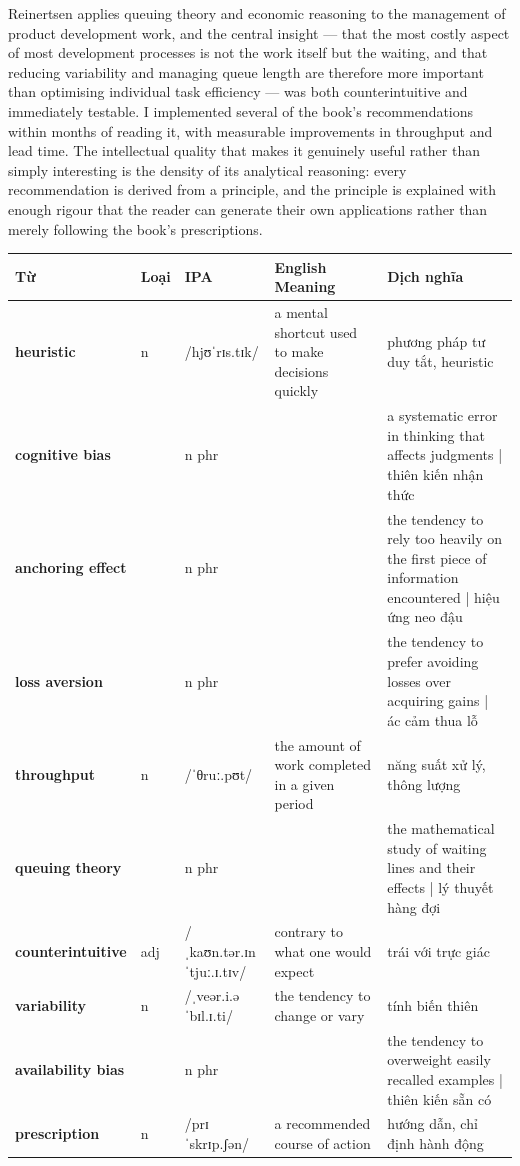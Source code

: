\begin{ieltsanswer}
Reinertsen applies queuing theory and economic reasoning to the management of product development work, and the central insight — that the most costly aspect of most development processes is not the work itself but the waiting, and that reducing variability and managing queue length are therefore more important than optimising individual task efficiency — was both counterintuitive and immediately testable. I implemented several of the book's recommendations within months of reading it, with measurable improvements in throughput and lead time. The intellectual quality that makes it genuinely useful rather than simply interesting is the density of its analytical reasoning: every recommendation is derived from a principle, and the principle is explained with enough rigour that the reader can generate their own applications rather than merely following the book's prescriptions.
\end{ieltsanswer}


\vspace{0.8em}
\begin{center}
\renewcommand{\arraystretch}{1.65}
\begin{tabularx}{\textwidth}{|V{0.22\textwidth}|C{0.07\textwidth}|I{0.20\textwidth}|Y|V{0.18\textwidth}|}
\hline
{}
\textbf{Từ} & \textbf{Loại} & \textbf{IPA} & \textbf{English Meaning} & \textbf{Dịch nghĩa} \\
\hline
\textbf{heuristic} & n & /hjʊˈrɪs.tɪk/ & a mental shortcut used to make decisions quickly & phương pháp tư duy tắt, heuristic \\ \hline
\textbf{cognitive bias} & & n phr & & a systematic error in thinking that affects judgments | thiên kiến nhận thức \\ \hline
\textbf{anchoring effect} & & n phr & & the tendency to rely too heavily on the first piece of information encountered | hiệu ứng neo đậu \\ \hline
\textbf{loss aversion} & & n phr & & the tendency to prefer avoiding losses over acquiring gains | ác cảm thua lỗ \\ \hline
\textbf{throughput} & n & /ˈθruː.pʊt/ & the amount of work completed in a given period & năng suất xử lý, thông lượng \\ \hline
\textbf{queuing theory} & & n phr & & the mathematical study of waiting lines and their effects | lý thuyết hàng đợi \\ \hline
\textbf{counterintuitive} & adj & /ˌkaʊn.tər.ɪnˈtjuː.ɪ.tɪv/ & contrary to what one would expect & trái với trực giác \\ \hline
\textbf{variability} & n & /ˌveər.i.əˈbɪl.ɪ.ti/ & the tendency to change or vary & tính biến thiên \\ \hline
\textbf{availability bias} & & n phr & & the tendency to overweight easily recalled examples | thiên kiến sẵn có \\ \hline
\textbf{prescription} & n & /prɪˈskrɪp.ʃən/ & a recommended course of action & hướng dẫn, chỉ định hành động \\ \hline
\end{tabularx}
\end{center}

